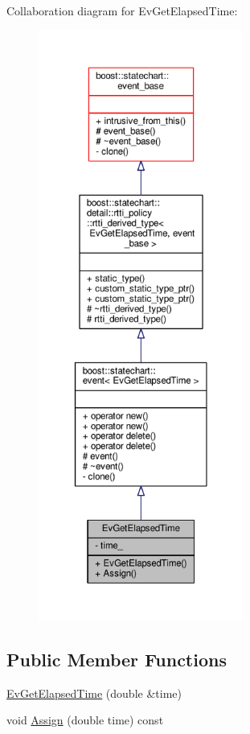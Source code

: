 Collaboration diagram for Ev\+Get\+Elapsed\+Time\+:
\nopagebreak
\begin{figure}[H]
\begin{center}
\leavevmode
\includegraphics[height=550pt]{struct_ev_get_elapsed_time__coll__graph}
\end{center}
\end{figure}
\subsection*{Public Member Functions}
\begin{DoxyCompactItemize}
\item 
\mbox{\hyperlink{struct_ev_get_elapsed_time_aaca1cea5f70b2a47ffcdd96424a7735c}{Ev\+Get\+Elapsed\+Time}} (double \&time)
\item 
void \mbox{\hyperlink{struct_ev_get_elapsed_time_aa0381285a0151abbc5e8a57d088cc394}{Assign}} (double time) const
\end{DoxyCompactItemize}

